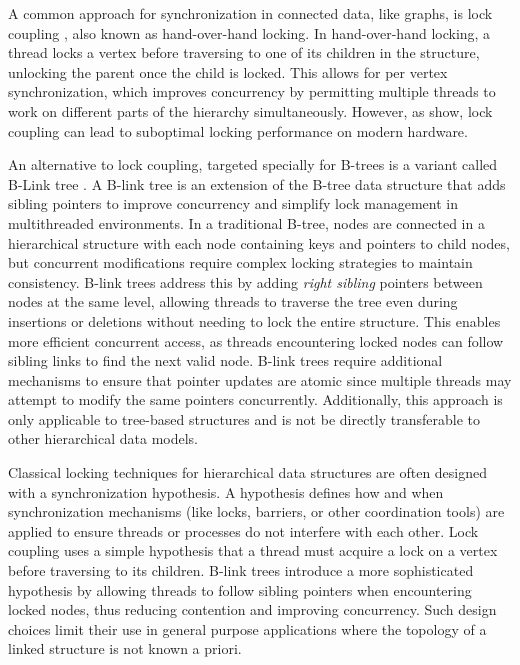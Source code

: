 A common approach for synchronization in connected data, like graphs, is lock coupling \cite{DBLP:journals/acta/BayerS77}, also known as hand-over-hand locking. In hand-over-hand locking, a thread locks a vertex before traversing to one of its children in the structure, unlocking the parent once the child is locked. 
This allows for per vertex synchronization, which improves concurrency by permitting multiple threads to work on different parts of the hierarchy simultaneously. 
However, as \citet{LeisH019} show, lock coupling can lead to suboptimal locking performance on modern hardware.


An alternative to lock coupling, targeted specially for B-trees is a variant called B-Link tree \cite{LehmanY81}. A B-link tree is an extension of the B-tree data structure that adds sibling pointers to improve concurrency and simplify lock management in multithreaded environments. In a traditional B-tree, nodes are connected in a hierarchical structure with each node containing keys and pointers to child nodes, but concurrent modifications require complex locking strategies to maintain consistency. B-link trees address this by adding \emph{right sibling} pointers between nodes at the same level, allowing threads to traverse the tree even during insertions or deletions without needing to lock the entire structure. This enables more efficient concurrent access, as threads encountering locked nodes can follow sibling links to find the next valid node. B-link trees require additional mechanisms to ensure that pointer updates are atomic since multiple threads may attempt to modify the same pointers concurrently. Additionally, this approach is only applicable to tree-based structures and is not be directly transferable to other hierarchical data models.


Classical locking techniques for hierarchical data structures are often designed with a synchronization hypothesis. A hypothesis defines how and when synchronization mechanisms (like locks, barriers, or other coordination tools) are applied to ensure threads or processes do not interfere with each other. Lock coupling uses a simple hypothesis that a thread must acquire a lock on a vertex before traversing to its children. B-link trees introduce a more sophisticated hypothesis by allowing threads to follow sibling pointers when encountering locked nodes, thus reducing contention and improving concurrency. Such design choices limit their use in general purpose applications where the topology of a linked structure is not known a priori. 

